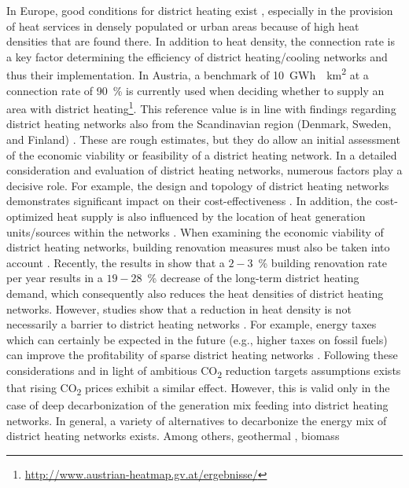 In Europe, good conditions for district heating exist \cite{persson2019heat}, especially in the provision of heat services in densely populated or urban areas \cite{inage2020development} because of high heat densities that are found there. In addition to heat density, the connection rate is a key factor determining the efficiency of district heating/cooling networks and thus their implementation. In Austria, a benchmark of \SI{10}{GWh \per km^2} at a connection rate of \SI{90}{\%} is currently used when deciding whether to supply an area with district heating\footnote{\url{http://www.austrian-heatmap.gv.at/ergebnisse/}}. This reference value  is in line with findings regarding district heating networks also from the Scandinavian region (Denmark, Sweden, and Finland) \cite{zinko2008district}. These are rough estimates, but they do allow an initial assessment of the economic viability or feasibility of a district heating network. In a detailed consideration and evaluation of district heating networks, numerous factors play a decisive role. For example, the design and topology of district heating networks demonstrates significant impact on their cost-effectiveness \cite{nussbaumer2016influence, zvoleff2009impact}. In addition, the cost-optimized heat supply is also influenced by the location of heat generation units/sources within the networks \cite{laasasenaho2019gis}.  When examining the economic viability of district heating networks, building renovation measures must also be taken into account \cite{andric2018impact}. Recently, the results in \cite{hietaharju2021stochastic} show that a $2-3$\SI{}{\%} building renovation rate per year results in a $19-28$\SI{}{\%} decrease of the long-term district heating demand, which consequently also reduces the heat densities of district heating networks. However, studies show that a reduction in heat density is not necessarily a barrier to district heating networks \cite{persson2011heat}. For example, energy taxes which can certainly be expected in the future (e.g., higher taxes on fossil fuels) can improve the profitability of sparse district heating networks \cite{reidhav2008profitability}. Following these considerations and in light of ambitious CO\textsubscript{2} reduction targets assumptions exists that rising CO\textsubscript{2} prices exhibit a similar effect. However, this is valid only in the case of deep decarbonization of the generation mix feeding into district heating networks. In general, a variety of alternatives to decarbonize the energy mix of district heating networks exists. Among others, geothermal \cite{kyriakis2016towards}, biomass 